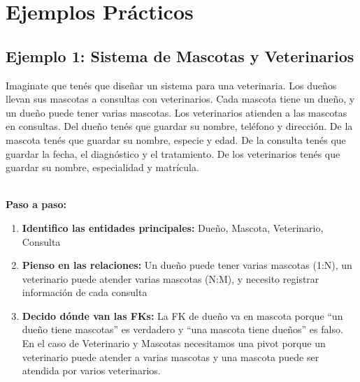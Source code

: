 \documentclass[12pt]{article}
\begin{document}
\section{Ejemplos Prácticos}

\subsection{Ejemplo 1: Sistema de Mascotas y Veterinarios}
Imaginate que tenés que diseñar un sistema para una veterinaria. Los dueños llevan sus mascotas a consultas con veterinarios. Cada mascota tiene un dueño, y un dueño puede tener varias mascotas. Los veterinarios atienden a las mascotas en consultas. Del dueño tenés que guardar su nombre, teléfono y dirección. De la mascota tenés que guardar su nombre, especie y edad. De la consulta tenés que guardar la fecha, el diagnóstico y el tratamiento. De los veterinarios tenés que guardar su nombre, especialidad y matrícula.

\textbf{\\Paso a paso:}
\begin{enumerate}
    \item \textbf{Identifico las entidades principales:} Dueño, Mascota, Veterinario, Consulta
    \item \textbf{Pienso en las relaciones:} Un dueño puede tener varias mascotas (1:N), un veterinario puede atender varias mascotas (N:M), y necesito registrar información de cada consulta
    \item \textbf{Decido dónde van las FKs:} La FK de dueño va en mascota porque ``un dueño tiene mascotas'' es verdadero y ``una mascota tiene dueños'' es falso. En el caso de Veterinario y Mascotas necesitamos una pivot porque un veterinario puede atender a varias mascotas y una mascota puede ser atendida por varios veterinarios.
\end{enumerate}
\end{document}

